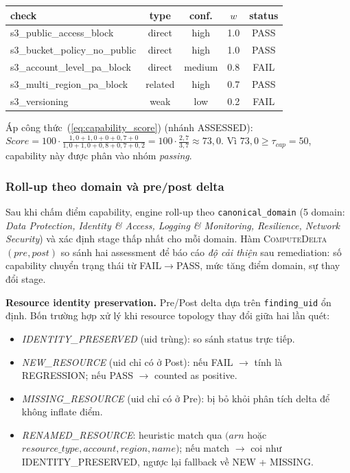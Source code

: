 \begin{table}[!htb]
  \centering
  \footnotesize
  \begin{tabular}{|l|c|c|c|c|}
    \hline
    \textbf{check} & \textbf{type} & \textbf{conf.} & $w$ & \textbf{status} \\ \hline
    s3\_public\_access\_block        & direct  & high   & 1.0 & PASS \\ \hline
    s3\_bucket\_policy\_no\_public   & direct  & high   & 1.0 & PASS \\ \hline
    s3\_account\_level\_pa\_block    & direct  & medium & 0.8 & FAIL \\ \hline
    s3\_multi\_region\_pa\_block     & related & high   & 0.7 & PASS \\ \hline
    s3\_versioning                   & weak    & low    & 0.2 & FAIL \\ \hline
  \end{tabular}
\end{table}

Áp công thức~(\ref{eq:capability_score}) (nhánh ASSESSED): $Score = 100 \cdot \frac{1{,}0+1{,}0+0+0{,}7+0}{1{,}0+1{,}0+0{,}8+0{,}7+0{,}2} = 100 \cdot \frac{2{,}7}{3{,}7} \approx 73{,}0$. Vì $73{,}0 \geq \tau_{cap}=50$, capability này được phân vào nhóm \textit{passing}.

\subsubsection*{Roll-up theo domain và pre/post delta}
Sau khi chấm điểm capability, engine roll-up theo \texttt{canonical\_domain} (5 domain: \textit{Data Protection, Identity \& Access, Logging \& Monitoring, Resilience, Network Security}) và xác định stage thấp nhất cho mỗi domain. Hàm \textsc{ComputeDelta}$(pre, post)$ so sánh hai assessment để báo cáo \textit{độ cải thiện} sau remediation: số capability chuyển trạng thái từ FAIL$\rightarrow$PASS, mức tăng điểm domain, sự thay đổi stage.

\textbf{Resource identity preservation.} Pre/Post delta dựa trên \texttt{finding\_uid} ổn định. Bốn trường hợp xử lý khi resource topology thay đổi giữa hai lần quét:
\begin{itemize}
  \item \textit{IDENTITY\_PRESERVED} (uid trùng): so sánh status trực tiếp.
  \item \textit{NEW\_RESOURCE} (uid chỉ có ở Post): nếu FAIL $\rightarrow$ tính là REGRESSION; nếu PASS $\rightarrow$ counted as positive.
  \item \textit{MISSING\_RESOURCE} (uid chỉ có ở Pre): bị bỏ khỏi phân tích delta để không inflate điểm.
  \item \textit{RENAMED\_RESOURCE}: heuristic match qua $(arn$ hoặc $resource\_type, account, region, name)$; nếu match $\rightarrow$ coi như IDENTITY\_PRESERVED, ngược lại fallback về NEW + MISSING.
\end{itemize}

